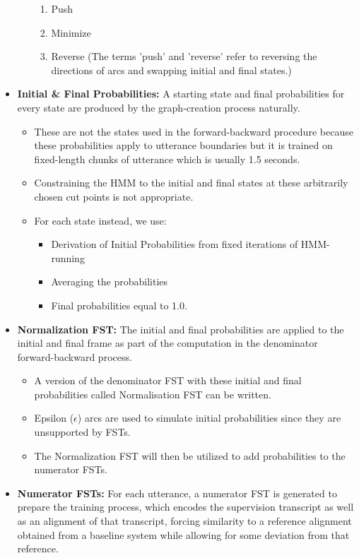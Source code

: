 \begin{itemize}
\begin{itemize}
\begin{enumerate}
            \item Push
            \item Minimize
            \item Reverse (The terms 'push' and 'reverse' refer to reversing the directions of arcs and swapping initial and final states.)
        \end{enumerate}
    \end{itemize}
    \item \textbf{Initial \& Final Probabilities:} A starting state and final probabilities for every state are produced by the graph-creation process naturally. 
    \begin{itemize}
        \item These are not the states used in the forward-backward procedure because these probabilities apply to utterance boundaries but it is trained on fixed-length chunks of utterance which is usually 1.5 seconds. 
        \item Constraining the HMM to the initial and final states at these arbitrarily chosen cut points is not appropriate. 
        \item For each state instead, we use: 
        \begin{itemize}
            \item Derivation of Initial Probabilities from fixed iterations of HMM-running 
            \item Averaging the probabilities
            \item Final probabilities equal to 1.0. %
        \end{itemize}        
    \end{itemize}    
    \item \textbf{Normalization FST:} The initial and final probabilities are applied to the initial and final frame as part of the computation in the denominator forward-backward process. 
    \begin{itemize}
        \item A version of the denominator FST with these initial and final probabilities called Normalisation FST can be written. 
        \item Epsilon ($\epsilon$) arcs are used to simulate initial probabilities since they are unsupported by FSTs. 
        \item The Normalization FST will then be utilized to add probabilities to the numerator FSTs.
    \end{itemize}   
    \item \textbf{Numerator FSTs:} For each utterance, a numerator FST is generated to prepare the training process, which encodes the supervision transcript as well as an alignment of that transcript, forcing similarity to a reference alignment obtained from a baseline system while allowing for some deviation from that reference. 

\end{itemize}
